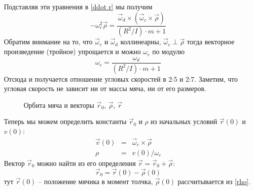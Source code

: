 \documentclass[a4paper,12pt]{article}
\begin{document}
	Подставляя эти уравнения в \eqref{ddot r} мы получим
	\begin{equation}
		\label{substitution}
		-\omega_c^2\vec{\rho}=\frac{\vec{\omega}_d\times (\vec{\omega}_c\times\vec{\rho})}{(R^2/I)\cdot m + 1}
	\end{equation}
	Обратим внимание на то, что $\vec{\omega}_c$ и $\vec{\omega}_d$ коллинеарны, $\vec{\omega}_c \perp \vec{\rho}$ тогда векторное произведение (тройное) упрощается и можно $\omega_c$ по модулю
	\begin{equation}
		\label{omega c}
		\omega_c=\frac{\omega_d}{(R^2/I)\cdot m + 1}
	\end{equation}
	Отсюда и получается отношение угловых скоростей в 2:5 и 2:7. Заметим, что угловая скорость не зависит ни от массы мяча, ни от его размеров.\\

	\begin{figure}[H]
		\centering
		\caption{Орбита мяча и векторы $\vec{r}_0$, $\vec{\rho}$, $\vec{r}$}
	\end{figure}
	
	Теперь мы можем определить константы $\vec{r}_0$ и $\rho$ из начальных условий $\vec{r}(0)$ и $v(0)$:
	\begin{eqnarray}
		\vec{v}(0)&=&\vec{\omega}_c\times\vec{\rho} \\
		\rho&=&v(0)/\omega_c \label{rho}
	\end{eqnarray}
	Вектор $\vec{r}_0$ можно найти из его определения $\vec{r}=\vec{r}_0+\vec{\rho}$:
	\begin{equation}
		\vec{r}_0=\vec{r}(0)-\vec{\rho}(0)
	\end{equation}
	тут $\vec{r}(0)$ -- положение мячика в момент толчка, $\vec{\rho}(0)$ рассчитывается из \eqref{rho}.\\
	
\end{document}
